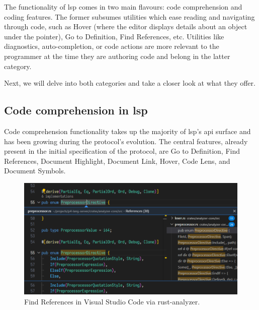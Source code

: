 The functionality of \acrshort{lsp} comes in two main flavours: code
comprehension and coding features. The former subsumes utilities which ease
reading and navigating through code, such as Hover (where the editor displays
details about an object under the pointer), Go to Definition, Find References,
etc. Utilities like diagnostics, auto-completion, or code actions are more
relevant to the programmer at the time they are authoring code and belong in the
latter category.

Next, we will delve into both categories and take a closer look at what they
offer.


\subsection{Code comprehension in \acrshort{lsp}}


\newcommand{\org}{\pdftooltip{(original)}{This request was present in the
original LSP specification.}}

Code comprehension functionality takes up the majority of \acrshort{lsp}'s
\acrshort{api} surface and has been growing during the protocol's evolution. The
central features, already present in the initial specification of the protocol,
are Go to Definition, Find References, Document Highlight, Document Link, Hover,
Code Lens, and Document Symbols.

\begin{figure}[h]
	\includegraphics[width=1.00\textwidth]{resources/code_find_references.png}
	\caption{Find References in Visual Studio Code via rust-analyzer.}
\end{figure}

